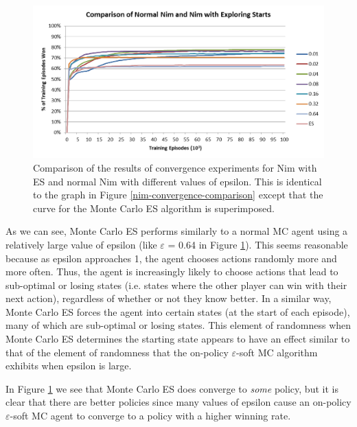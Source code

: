 \documentclass[11pt,a4paper]{report}
\begin{document}
\begin{figure}[htbp]
	\begin{center}
		\includegraphics[width=\linewidth]{Nim_PerformanceResults_Comparison_001_to_064_and_ES.png}
		\caption{Comparison of the results of convergence experiments for Nim with ES and normal Nim with different values of epsilon. This is identical to the graph in Figure \ref{nim-convergence-comparison} except that the curve for the Monte Carlo ES algorithm is superimposed.}
		\label{nim-convergence-comparison-with-ES}
	\end{center}
\end{figure}

As we can see, Monte Carlo ES performs similarly to a normal MC agent using a relatively large value of epsilon (like $\varepsilon$ = 0.64 in Figure \ref{nim-convergence-comparison-with-ES}). This seems reasonable because as epsilon approaches 1, the agent chooses actions randomly more and more often. Thus, the agent is increasingly likely to choose actions that lead to sub-optimal or losing states (i.e. states where the other player can win with their next action), regardless of whether or not they know better. In a similar way, Monte Carlo ES forces the agent into certain states (at the start of each episode), many of which are sub-optimal or losing states. This element of randomness when Monte Carlo ES determines the starting state appears to have an effect similar to that of the element of randomness that the on-policy $\varepsilon$-soft MC algorithm exhibits when epsilon is large.

In Figure \ref{nim-convergence-comparison-with-ES} we see that Monte Carlo ES does converge to \emph{some} policy, but it is clear that there are better policies since many values of epsilon cause an on-policy $\varepsilon$-soft MC agent to converge to a policy with a higher winning rate.
\end{document}
